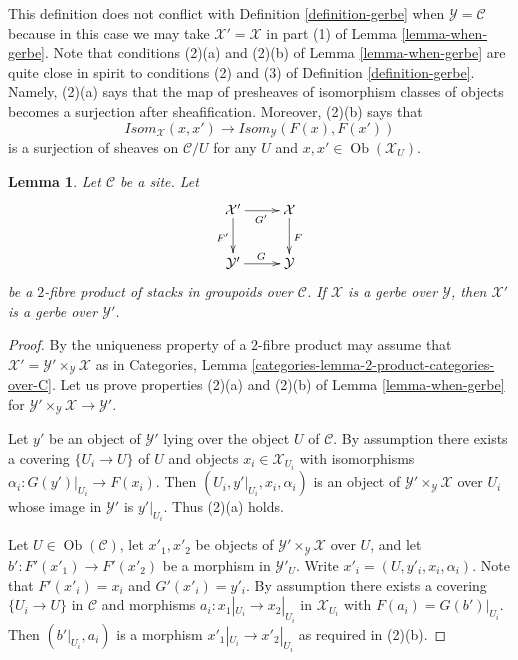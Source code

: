 \documentclass{stacks-project}
\theoremstyle{plain}
\newtheorem{lemma}[subsection]{Lemma}
\theoremstyle{definition}
\theoremstyle{remark}
\numberwithin{equation}{subsection}
\def\Ob{\mathop{\mathrm{Ob}}\nolimits}
\begin{document}
\noindent
This definition does not conflict with
Definition \ref{definition-gerbe}
when $\mathcal{Y} = \mathcal{C}$ because in this case we may take
$\mathcal{X}' = \mathcal{X}$ in part (1) of
Lemma \ref{lemma-when-gerbe}.
Note that conditions (2)(a) and (2)(b) of
Lemma \ref{lemma-when-gerbe}
are quite close in spirit to conditions (2) and (3) of
Definition \ref{definition-gerbe}.
Namely, (2)(a) says that the map of presheaves of isomorphism
classes of objects becomes a surjection after sheafification.
Moreover, (2)(b) says that
$$
\mathit{Isom}_\mathcal{X}(x, x')
\longrightarrow
\mathit{Isom}_\mathcal{Y}(F(x), F(x'))
$$
is a surjection of sheaves on $\mathcal{C}/U$ for any $U$ and
$x, x' \in \Ob(\mathcal{X}_U)$.

\begin{lemma}
\label{lemma-base-change-gerbe}
Let $\mathcal{C}$ be a site. Let
$$
\xymatrix{
\mathcal{X}' \ar[r]_{G'} \ar[d]_{F'} & \mathcal{X} \ar[d]^F \\
\mathcal{Y}' \ar[r]^G & \mathcal{Y}
}
$$
be a $2$-fibre product of stacks in groupoids over $\mathcal{C}$.
If $\mathcal{X}$ is a gerbe over $\mathcal{Y}$, then
$\mathcal{X}'$ is a gerbe over $\mathcal{Y}'$.
\end{lemma}

\begin{proof}
By the uniqueness property of a $2$-fibre product may assume that
$\mathcal{X}' = \mathcal{Y}' \times_\mathcal{Y} \mathcal{X}$
as in
Categories, Lemma \ref{categories-lemma-2-product-categories-over-C}.
Let us prove properties (2)(a) and (2)(b) of
Lemma \ref{lemma-when-gerbe}
for $\mathcal{Y}' \times_\mathcal{Y} \mathcal{X} \to \mathcal{Y}'$.

\medskip\noindent
Let $y'$ be an object of $\mathcal{Y}'$ lying over the object $U$
of $\mathcal{C}$. By assumption there exists
a covering $\{U_i \to U\}$ of $U$ and objects
$x_i \in \mathcal{X}_{U_i}$ with isomorphisms
$\alpha_i : G(y')|_{U_i} \to F(x_i)$.
Then $(U_i, y'|_{U_i}, x_i, \alpha_i)$ is an object of
$\mathcal{Y}' \times_\mathcal{Y} \mathcal{X}$ over $U_i$
whose image in $\mathcal{Y}'$ is $y'|_{U_i}$. Thus (2)(a) holds.

\medskip\noindent
Let $U \in \Ob(\mathcal{C})$, let $x'_1, x'_2$ be objects of
$\mathcal{Y}' \times_\mathcal{Y} \mathcal{X}$ over $U$, and let
$b' : F'(x'_1) \to F'(x'_2)$ be a morphism in $\mathcal{Y}'_U$.
Write $x'_i = (U, y'_i, x_i, \alpha_i)$. Note that $F'(x'_i) = x_i$
and $G'(x'_i) = y'_i$. By assumption there exists
a covering $\{U_i \to U\}$ in $\mathcal{C}$ and morphisms
$a_i : x_1|_{U_i} \to x_2|_{U_i}$ in $\mathcal{X}_{U_i}$ with
$F(a_i) = G(b')|_{U_i}$. Then $(b'|_{U_i}, a_i)$ is a morphism
$x'_1|_{U_i} \to x'_2|_{U_i}$ as required in (2)(b).
\end{proof}
\end{document}

